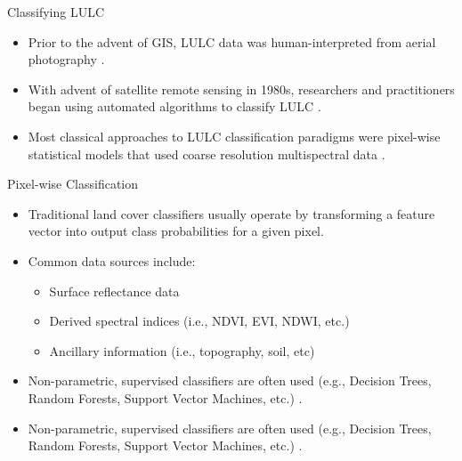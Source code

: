 \documentclass[aspectratio=169, hideallsubsectionså]{beamer}
\begin{document}

\begin{frame}{Classifying LULC}
    \begin{itemize}
        \item<1-> Prior to the advent of GIS, LULC data was human-interpreted from aerial photography \cite{andersonLanduseClassificationSchemes1971,andersonLandUseLand1977}.
        \item<2-> With advent of satellite remote sensing in 1980s, researchers and practitioners began using automated algorithms to classify LULC \cite{scarpace1980land}.
        \item<3-> Most classical approaches to LULC classification paradigms were pixel-wise statistical models that used coarse resolution multispectral data \cite{gislasonRandomForestsLand2006,gislasonRandomForestsLand2006,bakerAdvancesClassificationLand1991}.
    \end{itemize}
\end{frame}

\begin{frame}{Pixel-wise Classification}
    \begin{itemize}
        \item<1-> Traditional land cover classifiers usually operate by transforming a feature vector into output class probabilities for a given pixel.
        \item<2-> Common data sources include:
        \begin{itemize}
            \item<3-> Surface reflectance data
            \item<4-> Derived spectral indices (i.e., NDVI, EVI, NDWI, etc.)
            \item<5-> Ancillary information (i.e., topography, soil, etc) \cite{kavzogluEffectsAuxiliaryAncillary2023,wulderLandCover2018}
        \end{itemize}
        \item<6-> Non-parametric, supervised classifiers are often used (e.g., Decision Trees, Random Forests, Support Vector Machines, etc.) \cite{gislasonRandomForestsLand2006,gislasonRandomForestsLand2006,bakerAdvancesClassificationLand1991}.
        \item<7-> Non-parametric, supervised classifiers are often used (e.g., Decision Trees, Random Forests, Support Vector Machines, etc.) \cite{gislasonRandomForestsLand2006,gislasonRandomForestsLand2006,bakerAdvancesClassificationLand1991}.
    \end{itemize}
\end{frame}
\end{document}
